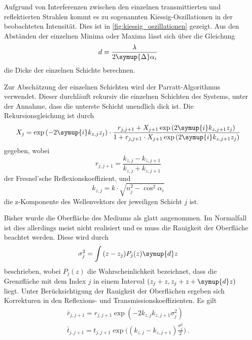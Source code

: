 Aufgrund von Interferenzen zwischen den einzelnen transmittierten und reflektierten Strahlen kommt es zu sogenannten Kiessig-Oszillationen \cite{kiessig} in der beobachteten Intensität.
Dies ist in \autoref{fig:kiessig_oszillationen} gezeigt.
Aus den Abständen der einzelnen Minima oder Maxima lässt sich über die Gleichung
\begin{equation} %
    d = \frac{\lambda}{2 \symup{\Delta} \alpha_i}
\end{equation}
die Dicke der einzelnen Schichte berechnen.

Zur Abschätzung der einzelnen Schichten wird der Parratt-Algorithmus \cite{parratt} verwendet.
Dieser durchläuft rekursiv die einzelnen Schichten des Systems,
unter der Annahme,
dass die unterste Schicht unendlich dick ist.
Die Rekursionsgleichung ist durch
\begin{equation}
    X_{j} = \exp{(-2\symup{i} k_{z, j} z_{j})} \cdot
    \frac{r_{j, j+1} + X_{j+1} \exp{(2\symup{i} k_{z, j+1} z_{j})}}
    {1 + r_{j, j+1} \cdot X_{j+1} \exp{(2\symup{i} k_{z, j+1} z_{j})}}
\end{equation}
gegeben,
wobei
\begin{equation}
    r_{j, j+1} = \frac{k_{z, j} - k_{z, j+1}}{k_{z, j} + k_{z, j+1}}
\end{equation}
der Fresnel'sche Reflexionskoeffizient,
und
\begin{equation}
    k_{z, j} = k \cdot \sqrt{n^2_j - \cos^2{\alpha_i}}
\end{equation}
die z-Komponente des Wellenvektors der jeweiligen Schicht $j$ ist.

Bisher wurde die Oberfläche des Mediums als glatt angenommen.
Im Normalfall ist dies allerdings meist nicht realisiert und es muss die Rauigkeit der Oberfläche beachtet werden.
Diese wird durch
\begin{equation}
    \sigma^2_j = \int{(z-z_j) P_j(z) \symup{d}z}
\end{equation}
beschrieben,
wobei $P_j(z)$ die Wahrscheinlichkeit bezeichnet,
dass die Grenzfläche mit dem Index $j$ in einem Interval $(z_j + z, z_j + z + \symup{d}z)$ liegt.
Unter Berücksichtigung der Rauigkeit der Oberflächen ergeben sich Korrekturen in den Reflexions- und Transmissionskoeffizienten.
Es gilt
\begin{gather}
    \bar{r}_{j, j+1} = r_{j, j+1} \exp{(-2 k_{z, j} k_{z, j+1} \sigma^2_{j})} \\
    \bar{t}_{j, j+1} = t_{j, j+1} \exp{\biggl((k_{z, j} - k_{z, j+1}) \frac{\sigma^2_{j}}{2}\biggr)} \ .
\end{gather}
